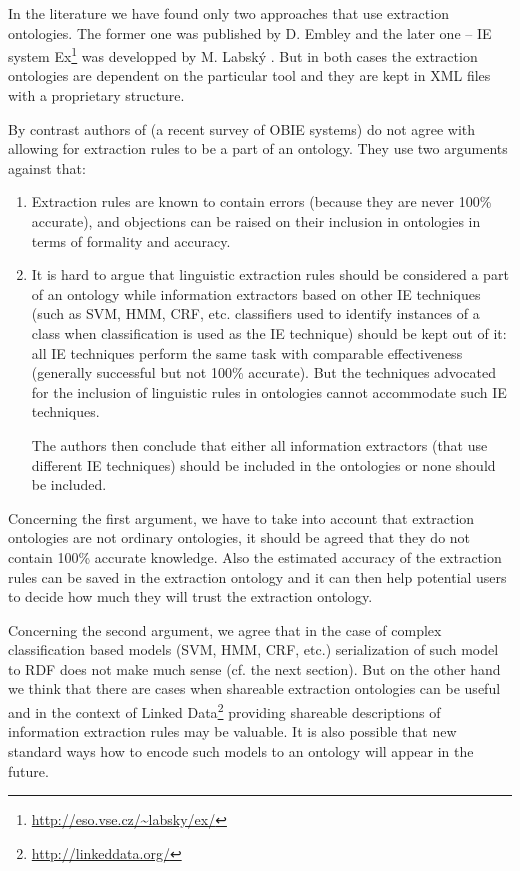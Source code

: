 In the literature we have found only two approaches that use extraction ontologies. The former one was published by D. Embley \citep{DBLP:conf/er/EmbleyTL02,Embley:2004:TSU:1012294.1012295}
and the later one -- IE system Ex\footnote{\url{http://eso.vse.cz/~labsky/ex/}} was developped by M. Labsk\'{y} \citep{springerlink:10.1007/978-3-642-01891-6_5}. 
But in both cases the extraction ontologies are dependent on the particular tool and they are kept in XML files with a proprietary structure.


By contrast authors of \citep{citeulike:7291004} (a recent survey of OBIE systems) do not agree with allowing for extraction rules to be a part of an ontology. They use two arguments against that:
\begin{enumerate}
	\item Extraction rules are known to contain errors (because they are never 100\% accurate), and objections can be raised on their inclusion in ontologies in terms of formality and accuracy.

	\item It is hard to argue that linguistic extraction rules should be considered a part of an ontology while information extractors based on other IE techniques (such as SVM, HMM, CRF, etc. classifiers used to identify instances of a class when classification is used as the IE technique) should be kept out of it: all IE techniques perform the same task with comparable effectiveness (generally successful but not 100\% accurate). But the techniques advocated for the inclusion of linguistic rules in ontologies cannot accommodate such IE techniques.
	
The authors then conclude that either all information extractors (that use different IE techniques) should be included in the ontologies or none should be included.
\end{enumerate}



Concerning the first argument, we have to take into account that extraction ontologies are not ordinary ontologies, it should be agreed that they do not contain 100\% accurate knowledge. Also the estimated accuracy of the extraction rules can be saved in the extraction ontology and it can then help potential users to decide how much they will trust the extraction ontology.

Concerning the second argument, we agree that in the case of complex classification based models (SVM, HMM, CRF, etc.) serialization of such model to RDF does not make much sense (cf. the next section). But on the other hand we think that there are cases when shareable extraction ontologies can be useful and in the context of Linked Data\footnote{\url{http://linkeddata.org/}} providing shareable descriptions of information extraction rules may be valuable. It is also possible that new standard ways how to encode such models to an ontology will appear in the future.


